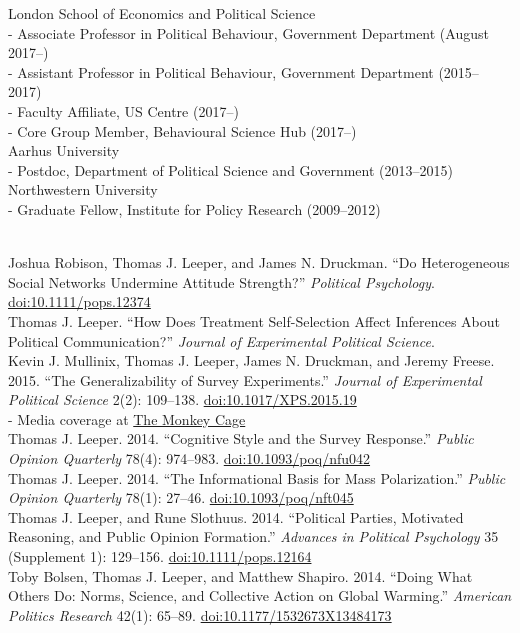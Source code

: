 \documentclass[12pt]{article}
\renewcommand{\section}[1]{\pagebreak[3]%
    \llap{\scshape\smash{\parbox[t]{\marginparwidth}{\raggedright {\color{lg}#1}}}}%
    \vspace{-\baselineskip}\par}
\newcommand{\topic}[1]{\pagebreak[3]\indent {\color{lg}{\footnotesize #1 }}\\}
\newcommand{\entry}[1]{\indent {\color{lg}\guillemotright}\hspace{2pt}#1\vspace{.25em}\\}
\newcommand{\subentry}[1]{{\color{lg}-} #1\vspace{.25em}\\}
\begin{document}
\section{Academic Appointments}
\entry{London School of Economics and Political Science}
    \subentry{Associate Professor in Political Behaviour, Government Department (August 2017--)}
    \subentry{Assistant Professor in Political Behaviour, Government Department (2015--2017)}
    \subentry{Faculty Affiliate, US Centre (2017--)}
    \subentry{Core Group Member, Behavioural Science Hub (2017--)}
\entry{Aarhus University}
    \subentry{Postdoc, Department of Political Science and Government (2013--2015)}
\entry{Northwestern University}
    \subentry{Graduate Fellow, Institute for Policy Research (2009--2012)}

\section{Publications}
\topic{Peer-Reviewed Publications: Political Science}
	\entry{Joshua Robison, Thomas J. Leeper, and James N. Druckman. ``Do Heterogeneous Social Networks Undermine Attitude Strength?'' \textit{Political Psychology}. \href{http://doi.org/10.1111/pops.12374}{doi:10.1111/pops.12374}}
	\entry{Thomas J. Leeper. ``How Does Treatment Self-Selection Affect Inferences About Political Communication?'' \textit{Journal of Experimental Political Science}.}
	\entry{Kevin J. Mullinix, Thomas J. Leeper, James N. Druckman, and Jeremy Freese. 2015. ``The Generalizability of Survey Experiments.'' \textit{Journal of Experimental Political Science} 2(2): 109--138. \href{http://doi.org/10.1017/XPS.2015.19}{doi:10.1017/XPS.2015.19}}
		\subentry{Media coverage at \href{https://www.washingtonpost.com/news/monkey-cage/wp/2016/03/09/does-social-science-have-a-replication-crisis/}{The Monkey Cage}}
	\entry{Thomas J. Leeper. 2014. ``Cognitive Style and the Survey Response.'' \textit{Public Opinion Quarterly} 78(4): 974--983. \href{http://doi.org/10.1093/poq/nfu042}{doi:10.1093/poq/nfu042}}
	\entry{Thomas J. Leeper. 2014. ``The Informational Basis for Mass Polarization.'' \textit{Public Opinion Quarterly} 78(1): 27--46. \href{http://doi.org/10.1093/poq/nft045}{doi:10.1093/poq/nft045}}
	\entry{Thomas J. Leeper, and Rune Slothuus. 2014. ``Political Parties, Motivated Reasoning, and Public Opinion Formation.'' \textit{Advances in Political Psychology} 35 (Supplement 1): 129--156. \href{http://doi.org/10.1111/pops.12164}{doi:10.1111/pops.12164}}
	\entry{Toby Bolsen, Thomas J. Leeper, and Matthew Shapiro. 2014. ``Doing What Others Do: Norms, Science, and Collective Action on Global Warming.'' \textit{American Politics Research} 42(1): 65--89. \href{http://doi.org/10.1177/1532673X13484173}{doi:10.1177/1532673X13484173}}
\end{document}
